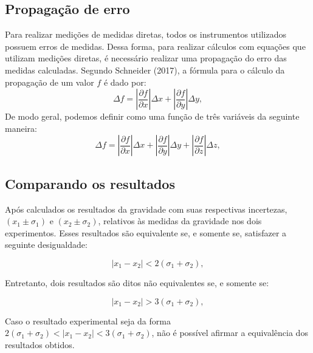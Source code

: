 \documentclass[12pt, twoside]{article}
\begin{document}
\subsection{Propagação de erro}

Para realizar medições de medidas diretas, todos os instrumentos utilizados possuem erros de medidas. Dessa forma, para realizar cálculos com equações que utilizam medições diretas, é necessário realizar uma propagação do erro das medidas calculadas.
Segundo Schneider (2017), a fórmula para o cálculo da propagação de um valor $f$ é dado por:
            \begin{equation}
                \label{eq:propagacao_de_erro} 
                \Delta f = \left| \frac{\partial f}{\partial x} \right| \Delta x + \left| \frac{\partial f}{\partial y} \right| \Delta y,
	    \end{equation}
De modo geral, podemos definir como uma função de três variáveis da seguinte maneira:
           \begin{equation}
    \label{eq:propagacao_de_erro_3}
    \Delta f = \left| \frac{\partial f}{\partial x} \right| \Delta x + \left| \frac{\partial f}{\partial y} \right| \Delta y + \left| \frac{\partial f}{\partial z} \right| \Delta z,
\end{equation}

\subsection{Comparando os resultados}
\label{Analise_de_eq}

Após calculados os resultados da gravidade com suas respectivas incertezas, $(x_1 \pm \sigma_1)$ e ${(x_2 \pm \sigma_2)}$, relativos às medidas da gravidade nos dois experimentos. Esses resultados são equivalente se, e somente se, satisfazer a seguinte desigualdade:
 
		\begin{equation}
        \label{eq:comparacao equivalente}
                |x_1 - x_2| < 2(\sigma_1 + \sigma_2),
	    \end{equation}
     
    Entretanto, dois resultados são ditos não equivalentes se, e somente se:
    
		\begin{equation}
            \label{eq:comparacao nao equivalente} 
                |x_1 - x_2| > 3(\sigma_1 + \sigma_2),
	    \end{equation}
     
    Caso o resultado experimental seja da forma $2(\sigma_1 + \sigma_2) < |x_1 - x_2| < 3(\sigma_1 + \sigma_2)$, não é possível afirmar a equivalência dos resultados obtidos.
\end{document}
